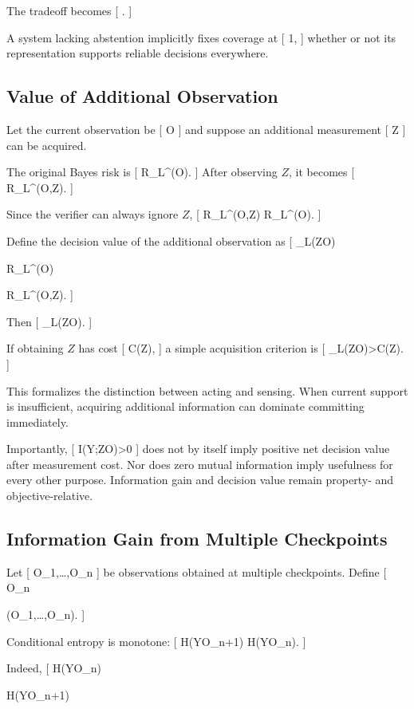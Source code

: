 \documentclass[11pt]{article}
\begin{document}
The tradeoff becomes
[
\quad{}\quad
{}.
]

A system lacking abstention implicitly fixes coverage at
[
1,
]
whether or not its representation supports reliable decisions everywhere.

\subsection{Value of Additional Observation}

Let the current observation be
[
O
]
and suppose an additional measurement
[
Z
]
can be acquired.

The original Bayes risk is
[
R_L^\star(O).
]
After observing $Z$, it becomes
[
R_L^\star(O,Z).
]

Since the verifier can always ignore $Z$,
[
R_L^\star(O,Z)
\leq
R_L^\star(O).
]

Define the decision value of the additional observation as
[
_L(Z\mid O)

R_L^\star(O)

R_L^\star(O,Z).
]

Then
[
_L(Z\mid O).
]

If obtaining $Z$ has cost
[
C(Z),
]
a simple acquisition criterion is
[
_L(Z\mid O)>C(Z).
]

This formalizes the distinction between acting and sensing. When current support is insufficient, acquiring additional information can dominate committing immediately.

Importantly,
[
I(Y;Z\mid O)>0
]
does not by itself imply positive net decision value after measurement cost. Nor does zero mutual information imply usefulness for every other purpose. Information gain and decision value remain property- and objective-relative.

\subsection{Information Gain from Multiple Checkpoints}

Let
[
O_1,\ldots,O_n
]
be observations obtained at multiple checkpoints. Define
[
O_{\leq n}

(O_1,\ldots,O_n).
]

Conditional entropy is monotone:
[
H(Y\mid O_{\leq n+1})
\leq
H(Y\mid O_{\leq n}).
]

Indeed,
[
H(Y\mid O_{\leq n})

H(Y\mid O_{\leq n+1})
\end{document}
